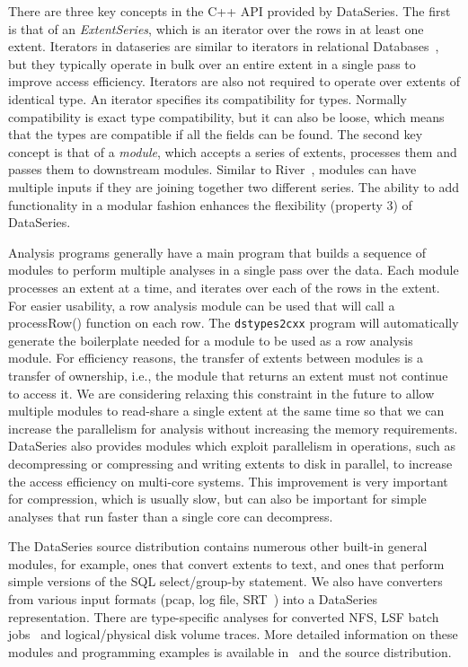 \documentclass{acm_proc_article-sp}
\begin{document}
There are three key concepts in the C++ API provided by
DataSeries. The first is that of an \textit{ExtentSeries}, which is an
iterator over the rows in at least one extent.  Iterators in
dataseries are similar to iterators in relational
Databases~\cite{graefeQueryProcessing93}, but they typically operate
in bulk over an entire extent in a single pass to improve access
efficiency.  Iterators 
are also not required to operate
over extents of identical type.  An iterator specifies its
compatibility for types.  Normally compatibility is exact type
compatibility, but it can also be loose, which means that the types
are compatible if all the fields can be found.  The second key concept
is that of a \textit{module}, which accepts a series of extents,
processes them and passes them to downstream modules.  Similar to
River~\cite{river99}, modules can have multiple inputs if they are
joining together two different series.  The ability to add
functionality in a modular fashion enhances the flexibility (property
3) of DataSeries.  


Analysis programs generally have a main program that builds a sequence
of modules to perform multiple analyses in a single pass over the
data. Each module processes an extent at a time, and iterates over
each of the rows in the extent.  For easier usability, a row analysis
module can be used that will call a processRow() function on each row.
The {\tt dstypes2cxx} program will automatically generate the boilerplate
needed for a module to be used as a row analysis module.
For efficiency reasons, the transfer of extents between
modules is a transfer of ownership, i.e., the module that returns an
extent must not continue to access it. We are considering relaxing
this constraint in the future to allow multiple modules to read-share
a single extent at the same time so that we can increase the 
parallelism for analysis without increasing the memory requirements.
DataSeries also provides modules which exploit parallelism in
operations, such as decompressing or compressing and writing extents
to disk in parallel, 
to increase the access efficiency on
multi-core systems.  This improvement is very important for
compression, which is usually slow, but can also be important for
simple analyses that run faster than a single core can decompress.

The DataSeries source distribution contains numerous other built-in
general modules, for example, ones that convert extents to text, and
ones that perform simple versions of the SQL select/group-by
statement.  We also have converters from various input formats (pcap,
log file, SRT~\cite{SRT}) into a DataSeries representation. 
There are type-specific analyses for converted NFS, LSF batch
jobs~\cite{PlatformLSF} and logical/physical disk volume traces.  More
detailed information on these modules and programming examples is
available 
in~\cite{DSTechnicalReportSnapshot} and the source distribution.
\end{document}
